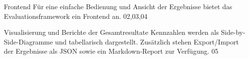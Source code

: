 \begin{center}
    {Frontend}
    {Für eine einfache Bedienung und Ansicht der Ergebnisse bietet das Evaluationsframework ein Frontend an.}
    {02,03,04}
\end{center}

\begin{center}
    {Visualisierung und Berichte der Gesamtresultate}
    {Kennzahlen werden als Side-by-Side-Diagramme und tabellarisch dargestellt. Zusätzlich stehen Export/Import der Ergebnisse als JSON sowie ein Markdown-Report zur Verfügung.}
    {05}
\end{center}